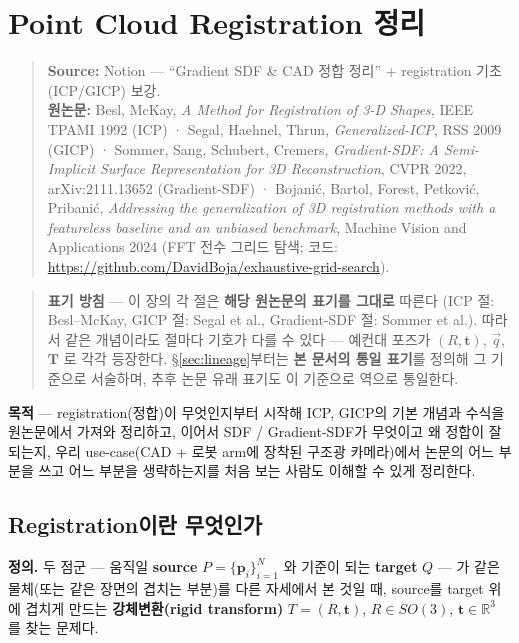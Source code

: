\chapter{Point Cloud Registration 정리}
\begin{quote}
  \small\textbf{Source:} Notion --- ``Gradient SDF \& CAD 정합 정리'' +
  registration 기초(ICP/GICP) 보강.\\
  \small\textbf{원논문:}
  Besl, McKay, \emph{A Method for Registration of 3-D Shapes}, IEEE TPAMI 1992
  (ICP) ·
  Segal, Haehnel, Thrun, \emph{Generalized-ICP}, RSS 2009 (GICP) ·
  Sommer, Sang, Schubert, Cremers, \emph{Gradient-SDF: A Semi-Implicit Surface
  Representation for 3D Reconstruction}, CVPR 2022, arXiv:2111.13652
  (Gradient-SDF) ·
  Bojanić, Bartol, Forest, Petković, Pribanić, \emph{Addressing the
  generalization of 3D registration methods with a featureless baseline and
  an unbiased benchmark}, Machine Vision and Applications 2024
  (FFT 전수 그리드 탐색; 코드:
  \url{https://github.com/DavidBoja/exhaustive-grid-search}).
\end{quote}

\begin{quote}
  \small\textbf{표기 방침} --- 이 장의 각 절은 \textbf{해당 원논문의 표기를
  그대로} 따른다 (ICP 절: Besl--McKay, GICP 절: Segal et al., Gradient-SDF
  절: Sommer et al.). 따라서 같은 개념이라도 절마다 기호가 다를 수 있다 ---
  예컨대 포즈가 $(R,\mathbf{t})$, $\vec{q}$, $\mathbf{T}$ 로 각각 등장한다.
  \S\ref{sec:lineage}부터는 \textbf{본 문서의 통일 표기}를 정의해 그
  기준으로 서술하며, 추후 논문 유래 표기도 이 기준으로 역으로 통일한다.
\end{quote}

\textbf{목적} --- registration(정합)이 무엇인지부터 시작해 ICP, GICP의 기본
개념과 수식을 원논문에서 가져와 정리하고, 이어서 SDF / Gradient-SDF가 무엇이고
왜 정합이 잘 되는지, 우리 use-case(CAD + 로봇 arm에 장착된 구조광 카메라)에서
논문의 어느 부분을 쓰고 어느 부분을 생략하는지를 처음 보는 사람도 이해할 수
있게 정리한다.

\section{Registration이란 무엇인가}

\textbf{정의.} 두 점군 --- 움직일 \textbf{source} $P=\{\mathbf{p}_i\}_{i=1}^{N}$
와 기준이 되는 \textbf{target} $Q$ --- 가 같은 물체(또는 같은 장면의 겹치는
부분)를 다른 자세에서 본 것일 때, source를 target 위에 겹치게 만드는
\textbf{강체변환(rigid transform)} $T=(R,\mathbf{t})$, $R\in SO(3)$,
$\mathbf{t}\in\mathbb{R}^3$ 를 찾는 문제다.

